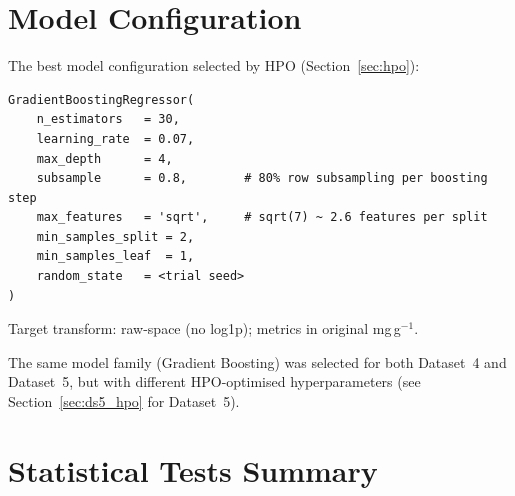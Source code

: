 \documentclass[12pt,a4paper]{article}
\begin{document}
\appendix
\section{Model Configuration}
\label{app:model}

The best model configuration selected by HPO (Section~\ref{sec:hpo}):

\begin{verbatim}
GradientBoostingRegressor(
    n_estimators   = 30,
    learning_rate  = 0.07,
    max_depth      = 4,
    subsample      = 0.8,        # 80% row subsampling per boosting step
    max_features   = 'sqrt',     # sqrt(7) ~ 2.6 features per split
    min_samples_split = 2,
    min_samples_leaf  = 1,
    random_state   = <trial seed>
)
\end{verbatim}

\noindent Target transform: raw-space (no log1p); metrics in original
mg\,g$^{-1}$.

The same model family (Gradient Boosting) was selected for both
Dataset~4 and Dataset~5, but with different HPO-optimised
hyperparameters (see Section~\ref{sec:ds5_hpo} for Dataset~5).

\section{Statistical Tests Summary}
\label{app:stats}
\end{document}
